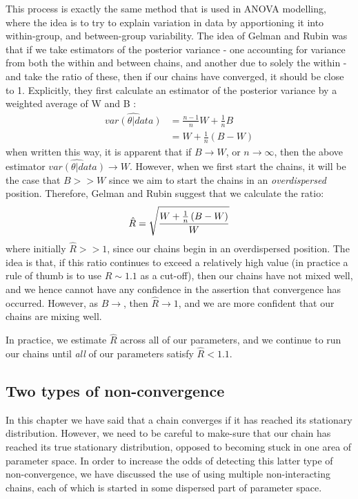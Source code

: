 \documentclass[11pt,fullpage]{book}
\begin{document}
This process is exactly the same method that is used in ANOVA modelling, where the idea is to try to explain variation in data by apportioning it into within-group, and between-group variability. The idea of Gelman and Rubin was that if we take estimators of the posterior variance - one accounting for variance from both the within and between chains, and another due to solely the within - and take the ratio of these, then if our chains have converged, it should be close to 1. Explicitly, they first calculate an estimator of the posterior variance by a weighted average of W and B \cite{gelman2013bayesian}:
%
\begin{equation}
\begin{align}
\widehat{var(\theta|data)} &= \frac{n-1}{n} W + \frac{1}{n} B\\
&= W + \frac{1}{n} \left(B - W\right)
\end{align}
\end{equation}
%
when written this way, it is apparent that if $B\rightarrow W$, or $n\rightarrow\infty$, then the above estimator $\widehat{var(\theta|data)}\rightarrow W$. However, when we first start the chains, it will be the case that $B>>W$ since we aim to start the chains in an \textit{overdispersed} position. Therefore, Gelman and Rubin suggest that we calculate the ratio:
%
\begin{equation}\label{eq:metropolisHastings_Rhat}\index{R hat}
\hat{R} = \sqrt{\frac{W + \frac{1}{n} \left(B - W\right)}{W}}
\end{equation}
%
where initially $\hat{R}>>1$, since our chains begin in an overdispersed position. The idea is that, if this ratio continues to exceed a relatively high value (in practice a rule of thumb is to use $\hat{R}\sim 1.1$ as a cut-off), then our chains have not mixed well, and we hence cannot have any confidence in the assertion that convergence has occurred. However, as $B\rightarrow $, then $\hat{R}\rightarrow 1$, and we are more confident that our chains are mixing well.

In practice, we estimate $\hat{R}$ across all of our parameters, and we continue to run our chains until \textit{all} of our parameters satisfy $\hat{R} < 1.1$. 

\subsection{Two types of non-convergence}
In this chapter we have said that a chain converges if it has reached its stationary distribution. However, we need to be careful to make-sure that our chain has reached its true stationary distribution, opposed to becoming stuck in one area of parameter space. In order to increase the odds of detecting this latter type of non-convergence, we have discussed the use of using multiple non-interacting chains, each of which is started in some dispersed part of parameter space. 
\end{document}

